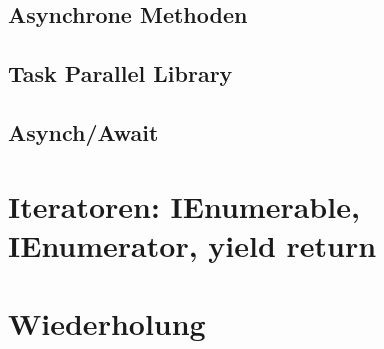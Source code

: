 \documentclass{scrreprt}
\begin{document}
\section{Asynchrone Methoden}

\section{Task Parallel Library}

\section{Asynch/Await}


\chapter{Iteratoren: IEnumerable, IEnumerator, yield return}



\chapter{Wiederholung}
\end{document}
